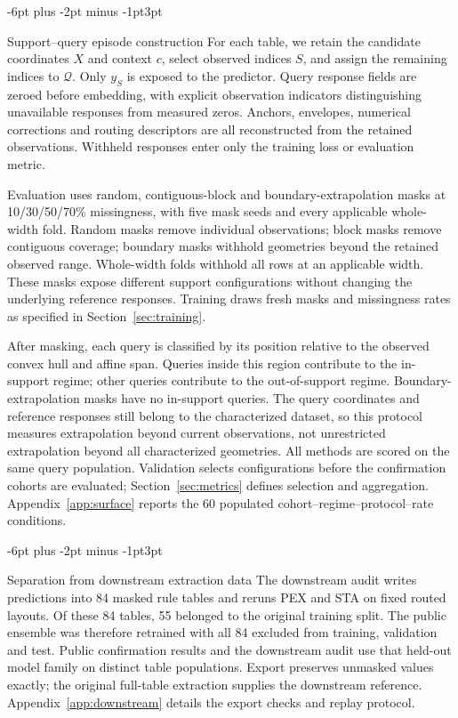 \documentclass{article}
\makeatletter
\renewcommand{\subsection}{\@startsection{subsection}{2}{\z@}
  {-6pt plus -2pt minus -1pt}{3pt}{\normalsize\sc\raggedright}}
\makeatother
\begin{document}
\subsection{Support--query episode construction}
For each table, we retain the candidate coordinates $X$ and context $c$, select
observed indices $S$, and assign the remaining indices to $\mathcal Q$.
Only $y_S$ is exposed to the predictor. Query response fields are zeroed before
embedding, with explicit observation indicators distinguishing unavailable
responses from measured zeros. Anchors, envelopes, numerical corrections and
routing descriptors are all reconstructed from the retained observations.
Withheld responses enter only the training loss or evaluation metric.

Evaluation uses random, contiguous-block and boundary-extrapolation masks at
10/30/50/70\% missingness, with five mask seeds and every applicable whole-width
fold. Random masks remove individual observations; block masks remove contiguous
coverage; boundary masks withhold geometries beyond the retained observed range.
Whole-width folds withhold all rows at an applicable width. These masks expose
different support configurations without changing the underlying reference
responses. Training draws fresh masks and missingness rates as specified in
Section~\ref{sec:training}.

After masking, each query is classified by its position relative to the observed
convex hull and affine span. Queries inside this region contribute to the
in-support regime; other queries contribute to the out-of-support regime.
Boundary-extrapolation masks have no in-support queries. The query coordinates
and reference responses still belong to the characterized dataset, so this
protocol measures extrapolation beyond current observations, not unrestricted
extrapolation beyond all characterized geometries. All methods are scored on
the same query population. Validation selects configurations before the
confirmation cohorts are evaluated; Section~\ref{sec:metrics} defines selection
and aggregation. Appendix~\ref{app:surface} reports the 60 populated
cohort--regime--protocol--rate conditions.

\subsection{Separation from downstream extraction data}
The downstream audit writes predictions into 84 masked rule tables and reruns
PEX and STA on fixed routed layouts. Of these 84 tables, 55 belonged to the
original training split. The public ensemble was therefore retrained with all
84 excluded from training, validation and test. Public confirmation results and
the downstream audit use that held-out model family on distinct table
populations. Export preserves unmasked values exactly; the original full-table
extraction supplies the downstream reference. Appendix~\ref{app:downstream}
details the export checks and replay protocol.
\end{document}
